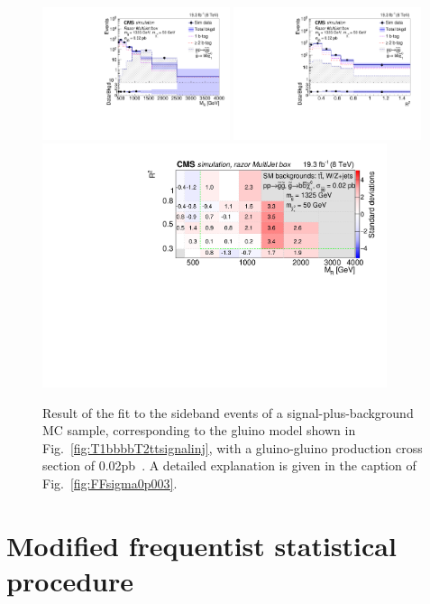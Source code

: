 \begin{figure}[htb!]
\centering
\includegraphics[width=0.49\textwidth]{figs/analysis8TeV/MR_T1bbbb_0p02_MultiJet.pdf}
\includegraphics[width=0.49\textwidth]{figs/analysis8TeV/RSQ_T1bbbb_0p02_MultiJet.pdf}
\includegraphics[width=0.9\textwidth]{figs/analysis8TeV/nSigmaLog_0p02_MultiJet.pdf}
\caption{Result of the fit to the sideband events of a
  signal-plus-background MC sample, corresponding to the gluino model
  shown in Fig.~\ref{fig:T1bbbbT2ttsignalinj}, with a gluino-gluino production cross section of 0.02\unit{pb}~\cite{jmgd}. A detailed explanation is
  given in the caption of Fig.~\ref{fig:FFsigma0p003}.\label{fig:FFsigma0p02}}
\end{figure}

\section{Modified frequentist statistical procedure}
\label{sec:limit8TeV}


